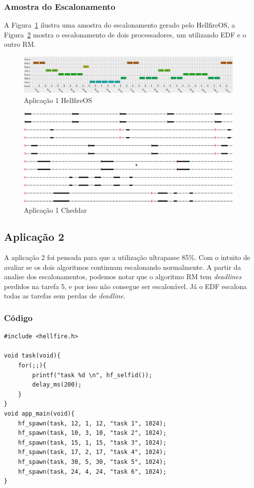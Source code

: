 \documentclass[12pt]{article}
\begin{document}
\subsubsection{Amostra do Escalonamento}

A Figura~\ref{fig:app1Hell} ilustra uma amostra do escalonamento gerado pelo HellfireOS, a Figura~\ref{fig:app1Chedder} mostra o escalonamento de dois processadores, um utilizando EDF e o outro RM. 

\begin{figure}[ht]
\centering
\caption{Aplicação 1 HellfireOS}
\label{fig:app1Hell}
\includegraphics[width=\columnwidth]{fig/app1HellSc.png}
\end{figure}

\begin{figure}[ht]
\centering
\caption{Aplicação 1 Cheddar}
\label{fig:app1Chedder}
\includegraphics[width=\columnwidth]{fig/app1CheSc.png}
\end{figure}

\subsection{Aplicação 2}
A aplicação 2 foi pensada para que a utilização ultrapasse 85\%. Com o intuito de avaliar se os dois algoritmos continuam escalonando normalmente. A partir da analise dos escalonamentos, podemos notar que o algoritmo RM tem \textit{deadlines} perdidos na tarefa 5, e por isso não consegue ser escalonável. Já o EDF escalona todas as tarefas sem perdas de \textit{deadline}.

\subsubsection{Código} 
\begin{lstlisting}[showstringspaces=false]
#include <hellfire.h>

void task(void){
	for(;;){
		printf("task %d \n", hf_selfid());		
		delay_ms(200);
	}
}
void app_main(void){
	hf_spawn(task, 12, 1, 12, "task 1", 1024);
	hf_spawn(task, 10, 3, 10, "task 2", 1024);
	hf_spawn(task, 15, 1, 15, "task 3", 1024);
	hf_spawn(task, 17, 2, 17, "task 4", 1024);
	hf_spawn(task, 30, 5, 30, "task 5", 1024);
	hf_spawn(task, 24, 4, 24, "task 6", 1024);
}
\end{lstlisting}
\end{document}

